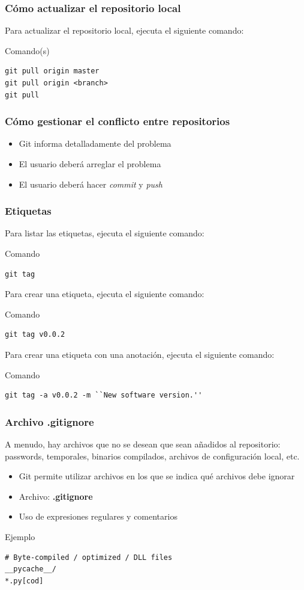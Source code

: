 \documentclass{beamer}
\begin{document}
\begin{frame}[fragile]
\frametitle{Cómo actualizar el repositorio local}
Para actualizar el repositorio local, ejecuta el siguiente comando:
\begin{block}{Comando(s)}
\begin{verbatim}
git pull origin master
git pull origin <branch>
git pull
\end{verbatim}
\end{block}
\end{frame}

\begin{frame}[fragile]
\frametitle{Cómo gestionar el conflicto entre repositorios}
\begin{itemize}
\item Git informa detalladamente del problema
\item El usuario deberá arreglar el problema
\item El usuario deberá hacer \textit{commit} y \textit{push}
\end{itemize}
\end{frame}

\begin{frame}[fragile]
\frametitle{Etiquetas}
Para listar las etiquetas, ejecuta el siguiente comando:
\begin{block}{Comando}
\begin{verbatim}
git tag
\end{verbatim}
\end{block}
\vskip 0.20cm
Para crear una etiqueta, ejecuta el siguiente comando:
\begin{block}{Comando}
\begin{verbatim}
git tag v0.0.2
\end{verbatim}
\end{block}
\vskip 0.20cm
Para crear una etiqueta con una anotación, ejecuta el siguiente comando:
\begin{block}{Comando}
\begin{verbatim}
git tag -a v0.0.2 -m ``New software version.''
\end{verbatim}
\end{block}
\end{frame}

\begin{frame}[fragile]
\frametitle{Archivo .gitignore}
A menudo, hay archivos que no se desean que sean añadidos al repositorio: passwords, temporales, binarios compilados, archivos de configuración local, etc.
\begin{itemize}
\item Git permite utilizar archivos en los que se indica qué archivos debe ignorar
\item Archivo: \textbf{.gitignore}
\item Uso de expresiones regulares y comentarios
\end{itemize}
\vskip 0.50cm
\begin{block}{Ejemplo}
\begin{verbatim}
# Byte-compiled / optimized / DLL files
__pycache__/
*.py[cod]
\end{verbatim}
\end{block}
\end{frame}
\end{document}
